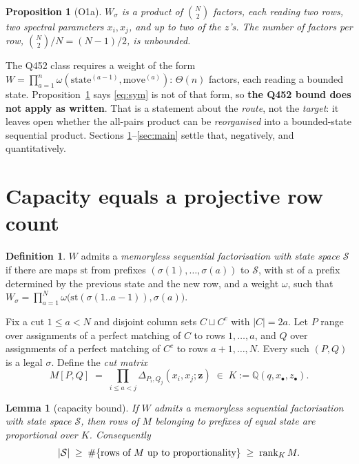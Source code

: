 \documentclass[11pt]{article}
\theoremstyle{plain}
\newtheorem{lem}[thm]{Lemma}
\newtheorem{prop}[thm]{Proposition}
\theoremstyle{definition}
\newtheorem{defn}[thm]{Definition}
\newcommand{\Dl}{\Delta}
\newcommand{\bz}{\bm{z}}
\begin{document}
\begin{prop}[O1a]\label{prop:census}
$W_\sigma$ is a product of $\binom{N}{2}$ factors, each reading two rows, two
spectral parameters $x_i,x_j$, and up to two of the $z$'s. The number of
factors per row, $\binom N2/N=(N-1)/2$, is unbounded.
\end{prop}

The Q452 class requires a weight of the form
$W=\prod_{a=1}^{n}\omega(\text{state}^{(a-1)},\text{move}^{(a)})$: $\Theta(n)$
factors, each reading a bounded state. Proposition~\ref{prop:census} says
\eqref{eq:sym} is not of that form, so \textbf{the Q452 bound does not apply as
written}. That is a statement about the \emph{route}, not the \emph{target}: it
leaves open whether the all-pairs product can be \emph{reorganised} into a
bounded-state sequential product. Sections \ref{sec:lemma}--\ref{sec:main}
settle that, negatively, and quantitatively.

\section{Capacity equals a projective row count}
\label{sec:lemma}

\begin{defn}\label{def:memoryless}
$W$ admits a \emph{memoryless sequential factorisation with state space
$\mathcal S$} if there are maps $\mathrm{st}$ from prefixes
$(\sigma(1),\dots,\sigma(a))$ to $\mathcal S$, with $\mathrm{st}$ of a prefix
determined by the previous state and the new row, and a weight $\omega$, such
that $W_\sigma=\prod_{a=1}^{N}\omega\bigl(\mathrm{st}(\sigma(1..a-1)),\sigma(a)\bigr)$.
\end{defn}

Fix a cut $1\le a<N$ and disjoint column sets $C\sqcup C^{c}$ with $|C|=2a$. Let
$P$ range over assignments of a perfect matching of $C$ to rows $1,\dots,a$, and
$Q$ over assignments of a perfect matching of $C^{c}$ to rows $a+1,\dots,N$.
Every such $(P,Q)$ is a legal $\sigma$. Define the \emph{cut matrix}
\begin{equation}\label{eq:cutmatrix}
M[P,Q]\;=\;\prod_{i\le a<j}\Dl_{P_i,Q_j}(x_i,x_j;\bz)\;\in\;K:=\mathbb Q(q,x_\bullet,z_\bullet).
\end{equation}

\begin{lem}[capacity bound]\label{lem:cap}
If $W$ admits a memoryless sequential factorisation with state space
$\mathcal S$, then rows of $M$ belonging to prefixes of equal state are
proportional over $K$. Consequently
\[
|\mathcal S|\;\ge\;\#\{\textup{rows of }M\textup{ up to proportionality}\}\;\ge\;\operatorname{rank}_K M .
\]
\end{lem}
\end{document}
